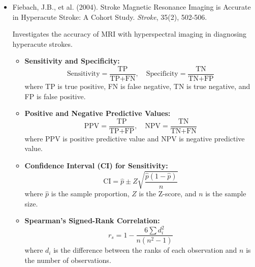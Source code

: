 \documentclass[10pt,svgnames,fragile]{beamer}
\begin{document}
\begin{frame}{}
\tiny
\begin{itemize}

    \item Fiebach, J.B., et al. (2004). Stroke Magnetic Resonance Imaging is Accurate in Hyperacute Stroke: A Cohort Study. \textit{Stroke}, 35(2), 502-506. \href{https://consensus.app/papers/stroke-magnetic-resonance-imaging-accurate-hyperacute-fiebach/f5f34a7ddc415e8b88f3c4b51ee76d5c/?utm_source=chatgpt}{\color{blue}{DOI: 10.1161/01.STR.0000114871.19735.23}} \cite{fiebachStrokeMagneticResonance2004}

    {\color{gray}Investigates the accuracy of MRI with hyperspectral imaging in diagnosing hyperacute strokes.}
    \begin{itemize} \tiny
    \item \textbf{Sensitivity and Specificity:}
    \[
    \text{Sensitivity} = \frac{\text{TP}}{\text{TP} + \text{FN}}, \quad \text{Specificity} = \frac{\text{TN}}{\text{TN} + \text{FP}}
    \]
    where TP is true positive, FN is false negative, TN is true negative, and FP is false positive.
    \item \textbf{Positive and Negative Predictive Values:}
    \[
    \text{PPV} = \frac{\text{TP}}{\text{TP} + \text{FP}}, \quad \text{NPV} = \frac{\text{TN}}{\text{TN} + \text{FN}}
    \]
    where PPV is positive predictive value and NPV is negative predictive value.
    \item \textbf{Confidence Interval (CI) for Sensitivity:}
    \[
    \text{CI} = \hat{p} \pm Z \sqrt{\frac{\hat{p}(1 - \hat{p})}{n}}
    \]
    where \( \hat{p} \) is the sample proportion, \( Z \) is the Z-score, and \( n \) is the sample size.
    \item \textbf{Spearman's Signed-Rank Correlation:}
    \[
    r_s = 1 - \frac{6 \sum d_i^2}{n(n^2 - 1)}
    \]
    where \( d_i \) is the difference between the ranks of each observation and \( n \) is the number of observations.
    \end{itemize}

\end{itemize}
\end{frame}
\end{document}
